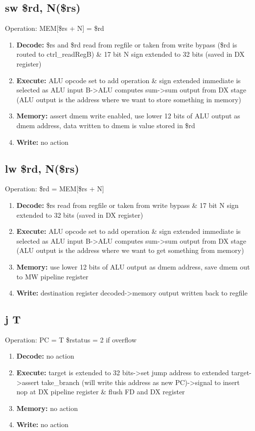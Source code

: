 \documentclass[letterpaper]{article}
\begin{document}
\subsection{sw \$rd, N(\$rs)}
Operation: MEM[\$rs + N] = \$rd
\begin{enumerate}
    \item \textbf{Decode:} \$rs and \$rd read from regfile or taken from write bypass (\$rd is routed to ctrl\_readRegB) \& 17 bit N sign extended to 32 bits (saved in DX register)
    \item \textbf{Execute:} ALU opcode set to add operation \& sign extended immediate is selected as ALU input B->ALU computes sum->sum output from DX stage (ALU output is the address where we want to store something in memory)
    \item \textbf{Memory:} assert dmem write enabled, use lower 12 bits of ALU output as dmem address, data written to dmem is value stored in \$rd
    \item \textbf{Write:} no action
\end{enumerate}

\subsection{lw \$rd, N(\$rs)}
Operation: \$rd = MEM[\$rs + N]
\begin{enumerate}
    \item \textbf{Decode:} \$rs read from regfile or taken from write bypass \& 17 bit N sign extended to 32 bits (saved in DX register)
    \item \textbf{Execute:} ALU opcode set to add operation \& sign extended immediate is selected as ALU input B->ALU computes sum->sum output from DX stage (ALU output is the address where we want to get something from memory)
    \item \textbf{Memory:} use lower 12 bits of ALU output as dmem address, save dmem out to MW pipeline register
    \item \textbf{Write:} destination register decoded->memory output written back to regfile
\end{enumerate}

\subsection{j T}
Operation: PC = T
\$rstatus = 2 if overflow
\begin{enumerate}
    \item \textbf{Decode:} no action
    \item \textbf{Execute:} target is extended to 32 bits->set jump address to extended target->assert take\_branch (will write this address as new PC)->signal to insert nop at DX pipeline register & flush FD and DX register
    \item \textbf{Memory:} no action
    \item \textbf{Write:} no action
\end{enumerate}
\end{document}
